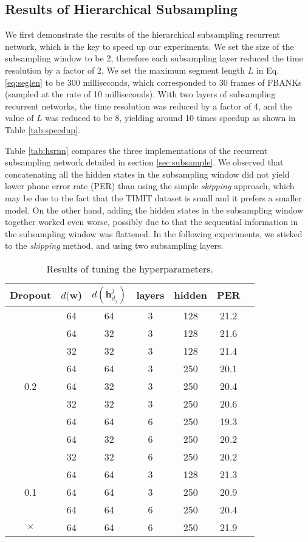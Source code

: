 \documentclass[a4paper]{article}
\begin{document}
\subsection{Results of Hierarchical Subsampling}

We first demonstrate the results of the hierarchical subsampling recurrent network, which is the key to speed up our experiments. We set the size of the subsampling window to be 2, therefore each subsampling layer reduced the time resolution by a factor of 2. We set the maximum segment length $L$ in Eq. \eqref{eq:seglen} to be 300 milliseconds, which corresponded to 30 frames of FBANKs (sampled at the rate of 10 milliseconds).  With two layers of subsampling recurrent networks, the time resolution was reduced by a factor of 4, and the value of $L$ was reduced to be 8, yielding around 10 times speedup as shown in Table \ref{tab:speedup}. 

Table \ref{tab:hsrnn} compares the three implementations of the recurrent subsampling network detailed in section \ref{sec:subsample}. We observed that concatenating all the hidden states in the subsampling window did not yield lower phone error rate (PER) than using the simple {\it skipping} approach, which may be due to the fact that the TIMIT dataset is small and it prefers a smaller model. On the other hand, adding the hidden states in the subsampling window together worked even worse, possibly due to that the sequential information in the subsampling window was flattened. In the following experiments, we sticked to the {\it skipping} method, and using two subsampling layers.

 \begin{table}
 \centering \small
\caption{Results of tuning the hyperparameters. }\vskip 1.5mm
\label{tab:tune}
\begin{tabular}{c|cccccc}
\hline

\hline
Dropout  & $d(\mathbf{w}$) & $d(\mathbf{h}_{d_j}^j)$ & layers & hidden & PER  \\ \hline
 & 64 & 64 & 3 & 128  & 21.2 \\
& 64 & 32 & 3 & 128 & 21.6 \\
 & 32 & 32 & 3 & 128  & 21.4 \\ \cline{2-6}
  & 64 & 64 & 3 & 250 & 20.1 \\
 0.2 & 64 & 32 & 3 & 250 & 20.4 \\
 & 32 & 32 & 3 & 250 & 20.6 \\ \cline{2-6}
 & 64 & 64 & 6 & 250 & 19.3 \\
 & 64 & 32 & 6 & 250 & 20.2  \\
 & 32 & 32 & 6 & 250 & 20.2 \\ \hline
 & 64 & 64 & 3 & 128 & 21.3 \\
0.1 & 64 & 64 & 3 & 250 & 20.9 \\
 & 64 & 64 & 6 & 250 & 20.4 \\ \hline
$\times$  & 64 & 64 & 6 & 250 & 21.9 \\
\hline

\hline
\end{tabular}
\vskip-4mm
\end{table}
\end{document}

